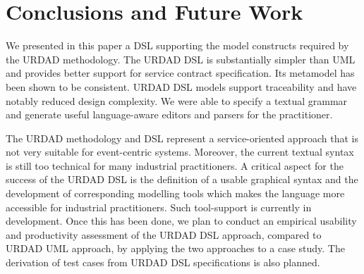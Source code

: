 \section{Conclusions and Future Work \label{sec:conclusionsAndOutlook}}
We presented in this paper a DSL supporting the model constructs required by the URDAD methodology. The URDAD DSL is substantially simpler than UML and provides better support for service contract specification. Its metamodel has been shown to be consistent. URDAD DSL models support traceability and have notably reduced design complexity. We were able to specify a textual grammar and generate useful language-aware editors and parsers for the practitioner.

The URDAD methodology and DSL represent a service-oriented approach that is not very suitable for event-centric systems. Moreover, the current textual syntax is still too technical for many industrial practitioners. A critical aspect for the success of the URDAD DSL is the definition of a usable graphical syntax and the development of corresponding modelling tools which makes the language more accessible for industrial practitioners. Such tool-support is currently in development. Once this has been done, we plan to conduct an empirical usability and productivity assessment of the URDAD DSL approach, compared to URDAD UML approach, by applying the two approaches to a case study. The derivation of test cases from URDAD DSL specifications is also planned.
